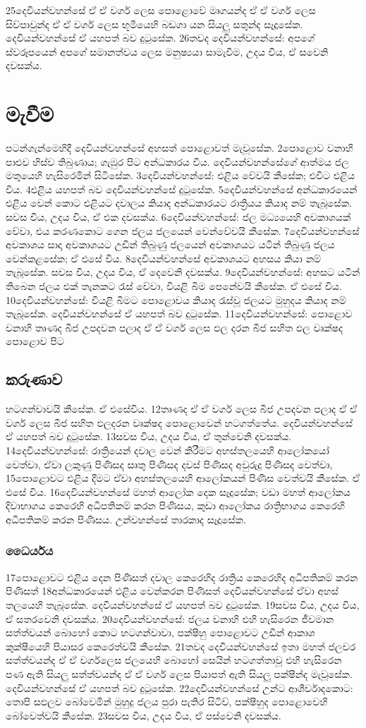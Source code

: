 \documentclass[10pt]{book}
\begin{document}
25දෙවියන්වහන්සේ ඒ ඒ වර්ග ලෙස පොළොවේ මෘගයන්ද ඒ ඒ වර්ග ලෙස සිව්පාවුන්ද ඒ ඒ වර්ග ලෙස භූමියෙහි බඩගා යන සියලු සතුන්ද සෑදූසේක. දෙවියන්වහන්සේ ඒ යහපත් බව දුටුසේක. 26තවද දෙවියන්වහන්සේ: අපගේ ස්වරූපයෙන් අපගේ සමානත්වය ලෙස මනුෂ්‍යයා සාමැවීම, උදය විය, ඒ සවෙනි දවසක්ය. 
 
\section{මැවීම}                  
පටන්ගැන්මෙහිදී දෙවියන්වහන්සේ අහසත් පොළොවත් මැවූසේක. 2පොළොව වනාහි පාළුව හිස්ව තිබුණාය; ගැඹුර පිට අන්ධකාරය විය. දෙවියන්වහන්සේගේ ආත්මය ජල මතුයෙහි හැසිරෙමින් සිටිසේක. 3දෙවියන්වහන්සේ: එළිය වේවයි කීසේක; එවිට එළිය විය. 4එළිය යහපත් බව දෙවියන්වහන්සේ දුටුසේක. 5දෙවියන්වහන්සේ අන්ධකාරයෙන් එළිය වෙන් කොට එළියට දවාලය කියාද අන්ධකාරයට රාත්‍රියය කියාද නම් තැබූසේක. සවස විය, උදය විය, ඒ එක දවසක්ය. 6දෙවියන්වහන්සේ: ජල මධ්‍යයෙහි අවකාශයක් වේවා, එය කරණකොට ගෙන ජලය ජලයෙන් වෙන්වේවයි කීසේක. 7දෙවියන්වහන්සේ අවකාශය සාදා අවකාශයට උඩින් තිබුණු ජලයෙන් අවකාශයට යටින් තිබුණු ජලය වෙන්කළසේක; ඒ එසේ විය. 8දෙවියන්වහන්සේ අවකාශයට අහසය කියා නම් තැබූසේක. සවස විය, උදය විය, ඒ දෙවෙනි දවසක්ය. 9දෙවියන්වහන්සේ: අහසට යටින් තිබෙන ජලය එක් තැනකට රැස් වේවා, වියළි බිම පෙනේවයි කීසේක. ඒ එසේ විය. 10දෙවියන්වහන්සේ: වියළි බිමට පොළොවය කියාද රැස්වූ ජලයට මුහුදය කියාද නම් තැබූසේක. දෙවියන්වහන්සේ ඒ යහපත් බව දුටුසේක. 11දෙවියන්වහන්සේ: පොළොව වනාහි තෘණද බීජ උපදවන පලාද ඒ ඒ වර්ග ලෙස ඵල දරන බීජ සහිත ඵල වෘක්ෂද පොළොව පිට 

\subsection{කරුණාව}
හටගන්වාවයි කීසේක. ඒ එසේවිය. 12තෘණද ඒ ඒ වර්ග ලෙස බීජ උපදවන පලාද ඒ ඒ වර්ග ලෙස බීජ සහිත ඵලදරන වෘක්ෂද පොළොවෙන් හටගත්තේය. දෙවියන්වහන්සේ ඒ යහපත් බව දුටුසේක. 13සවස විය, උදය විය, ඒ තුන්වෙනි දවසක්ය. 14දෙවියන්වහන්සේ: රාත්‍රියෙන් දවාල වෙන් කිරීමට අහස්තලයෙහි ආලෝකයෝ වෙත්වා, ඒවා ලකුණු පිණිසද සෘතු පිණිසද දවස් පිණිසද අවුරුදු පිණිසද වෙත්වා, 15පොළොවට එළිය දීමට ඒවා අහස්තලයෙහි ආලෝකයන් පිණිස වෙත්වයි කීසේක. ඒ එසේ විය. 16දෙවියන්වහන්සේ මහත් ආලෝක දෙක සෑදූසේක; වඩා මහත් ආලෝකය දිවාභාගය කෙරෙහි අධිපතිකම් කරන පිණිසය, කුඩා ආලෝකය රාත්‍රිභාගය කෙරෙහි අධිපතිකම් කරන පිණිසය. උන්වහන්සේ තාරකාද සෑදූසේක.

\subsubsection{ධෛර්යය}
 17පොළොවට එළිය දෙන පිණිසත් දවාල කෙරෙහිද රාත්‍රිය කෙරෙහිද අධිපතිකම් කරන පිණිසත් 18අන්ධකාරයෙන් එළිය වෙන්කරන පිණිසත් දෙවියන්වහන්සේ ඒවා අහස් තලයෙහි තැබූසේක. දෙවියන්වහන්සේ ඒ යහපත් බව දුටුසේක. 19සවස විය, උදය විය, ඒ සතරවෙනි දවසක්ය. 20දෙවියන්වහන්සේ: ජලය වනාහි එහි හැසිරෙන ජීවමාන සත්ත්වයන් බොහෝ කොට හටගන්වාවා, පක්ෂීහු පොළොවට උඩින් ආකාශ කුක්ෂීයෙහි පියාසර කෙරෙත්වයි කීසේක. 21තවද දෙවියන්වහන්සේ ඉතා මහත් ජලචර සත්ත්වයන්ද ඒ ඒ වර්ගලෙස ජලයෙහි බොහෝ සෙයින් හටගත්තාවූ එහි හැසිරෙන පණ ඇති සියලු සත්ත්වයන්ද ඒ ඒ වර්ග ලෙස පියාපත් ඇති සියලු පක්ෂීන්ද මැවූසේක. දෙවියන්වහන්සේ ඒ යහපත් බව දුටුසේක. 22දෙවියන්වහන්සේ උන්ට ආශීර්වාදකොට: තොපි සඵලව බෝවෙමින් මුහුදු ජලය පුරා පැතිර සිටිව්, පක්ෂීහුද පොළොවෙහි බෝවෙත්වයි කීසේක. 23සවස විය, උදය විය, ඒ පස්වෙනි දවසක්ය.
 
\end{document}
